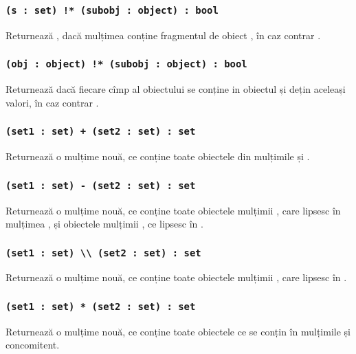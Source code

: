 \subsubsection{\lstinline|(s : set) !* (subobj : object) : bool|}

Returnează \false{}, dacă mulțimea  conține fragmentul de obiect , în caz contrar \true{}.

\subsubsection{\lstinline|(obj : object) !* (subobj : object) : bool|}

Returnează \false{} dacă fiecare cîmp al obiectului  se conține in obiectul  și dețin aceleași valori, în caz contrar \true{}.

\subsubsection{\lstinline|(set1 : set) + (set2 : set) : set|}

Returnează o mulțime nouă, ce conține toate obiectele din mulțimile  și .

\subsubsection{\lstinline|(set1 : set) - (set2 : set) : set|}

Returnează o mulțime nouă, ce conține toate obiectele mulțimii , care lipsesc în mulțimea , și obiectele mulțimii , ce lipsesc în .

\subsubsection{\lstinline|(set1 : set) \\ (set2 : set) : set|}

Returnează o mulțime nouă, ce conține toate obiectele mulțimii , care lipsesc în .

\subsubsection{\lstinline|(set1 : set) * (set2 : set) : set|}

Returnează o mulțime nouă, ce conține toate obiectele ce se conțin în mulțimile  și  concomitent.

